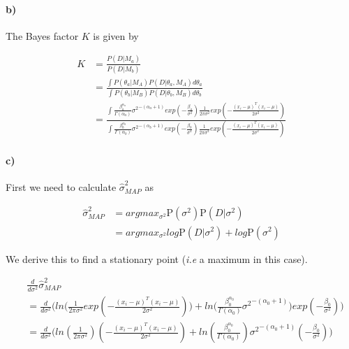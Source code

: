 \documentclass{article}
\begin{document}
\paragraph{b)}

The Bayes factor $K$ is given by

\begin{align*}
  K &= \frac{P \left( D \vert M_a \right)}{P \left( D \vert M_b \right)} \\
  &= \frac{ \int P \left( \theta_a \vert M_A \right) P \left( D \vert \theta_a , M_A \right) d \theta_a}
  { \int P \left( \theta_b \vert M_B \right) P \left( D \vert \theta_b , M_B \right) d \theta_b} \\
  &= \frac{ \displaystyle \int \frac{\beta_{a}^{\alpha_a}}{\Gamma (\alpha_a)}
    {\sigma^2}^{-(\alpha_a + 1)} exp \left( - \frac{\beta_a}{\sigma^2} \right)
    \frac{1}{2\pi\sigma^2}
    exp{\left( - \frac{(x_i - \mu)^T(x_i - \mu)}{2\sigma^2} \right)}}
    { \displaystyle \int \frac{\beta_{b}^{\alpha_b}}{\Gamma (\alpha_b)}
    {\sigma^2}^{-(\alpha_b + 1)} exp \left( - \frac{\beta_b}{\sigma^2} \right)
    \frac{1}{2\pi\sigma^2}
    exp{\left( - \frac{(x_i - \mu)^T(x_i - \mu)}{2\sigma^2} \right)}}
\end{align*}

\paragraph{c)}

First we need to calculate $\hat{\sigma}^2_{MAP}$ as

\begin{align*}
  \hat{\sigma}^2_{MAP}
    &= argmax_{\sigma^2} \text{P} \left( \sigma^2 \right) \text{P} \left( D \vert \sigma^2 \right) \\
    &= argmax_{\sigma^2} log \text{P} \left( D \vert \sigma^2 \right) + log \text{P} \left( \sigma^2 \right)
\end{align*}

We derive this to find a stationary point (\emph{i.e} a maximum in this case).

\begin{align*}
  & \frac{d}{d\sigma^2} \hat{\sigma}^2_{MAP} \\
  &= \frac{d}{d\sigma^2} \Bigg( ln \Bigg( \frac{1}{2\pi\sigma^2}
    exp{\left( - \frac{(x_i - \mu)^T(x_i - \mu)}{2\sigma^2} \right)} \Bigg) +
    ln \Bigg( \frac{\beta_{0}^{\alpha_0}}{\Gamma (\alpha_0)}
    {\sigma^2}^{- \left( \alpha_0 + 1 \right)} \Bigg)
    exp \left( - \frac{\beta_0}{\sigma^2} \right) \Bigg) \\
  &= \frac{d}{d\sigma^2} \Bigg( ln \left( \frac{1}{2\pi\sigma^2} \right)
    {\left( - \frac{(x_i - \mu)^T(x_i - \mu)}{2\sigma^2} \right)} +
    ln \left( \frac{\beta_{0}^{\alpha_0}}{\Gamma (\alpha_0)} \right)
    {\sigma^2}^{- \left( \alpha_0 + 1 \right)}
    \left( - \frac{\beta_0}{\sigma^2} \right) \Bigg)
\end{align*}
\end{document}
